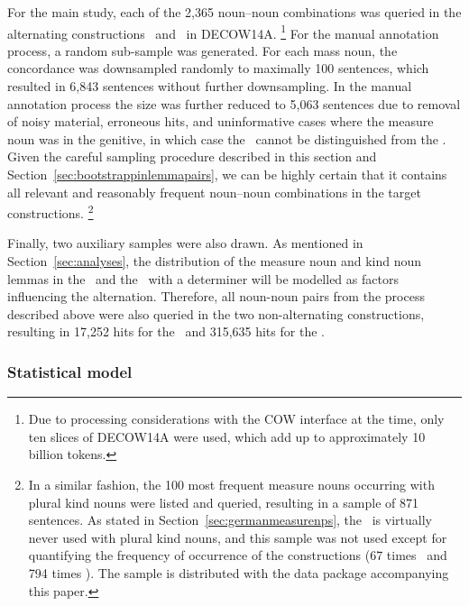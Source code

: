For the main study, each of the 2,365 noun–noun combinations was queried in the alternating constructions \PGCa\ and \NACa\ in DECOW14A.%
\footnote{Due to processing considerations with the COW interface at the time, only ten slices of DECOW14A were used, which add up to approximately 10 billion tokens.}
For the manual annotation process, a random sub-sample was generated.
For each mass noun, the concordance was downsampled randomly to maximally 100 sentences, which resulted in 6,843 sentences without further downsampling.
In the manual annotation process the size was further reduced to 5,063 sentences due to removal of noisy material, erroneous hits, and uninformative cases where the measure noun was in the genitive, in which case the \NACa\ cannot be distinguished from the \PGCa.
Given the careful sampling procedure described in this section and Section~\ref{sec:bootstrappinlemmapairs}, we can be highly certain that it contains all relevant and reasonably frequent noun–noun combinations in the target constructions.%
\footnote{In a similar fashion, the 100 most frequent measure nouns occurring with plural kind nouns were listed and queried, resulting in a sample of 871 sentences.
As stated in Section~\ref{sec:germanmeasurenps}, the \NACa\ is virtually never used with plural kind nouns, and this sample was not used except for quantifying the frequency of occurrence of the constructions (67 times \NACa\ and 794 times \PGCa).
The sample is distributed with the data package accompanying this paper.}

Finally, two auxiliary samples were also drawn.
As mentioned in Section~\ref{sec:analyses}, the distribution of the measure noun and kind noun lemmas in the \NACb\ and the \PGCd\ with a determiner will be modelled as factors influencing the alternation.
Therefore, all noun-noun pairs from the process described above were also queried in the two non-alternating constructions, resulting in 17,252 hits for the \PGCd\ and 315,635 hits for the \NACb.

\subsubsection{Statistical model}
\label{sec:mainstudystatisticalmodel}

